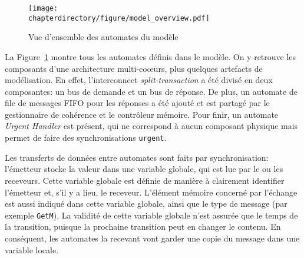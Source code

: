 \begin{figure}[hbt!]
\begin{center}
\texttt{[image: \\chapterdirectory/figure/model\_overview.pdf]}
\end{center}
\caption{Vue d'ensemble des automates du modèle}
\label{fr:fig:UPPAAL:automata_overview}
\end{figure}

La Figure~\ref{fr:fig:UPPAAL:automata_overview} montre tous les automates
définis dans le modèle. On y retrouve les composants d'une architecture multi-coœurs, plus quelques artefacts de modélisation. En effet,
l'interconnect \textit \textit{split-transaction} a été divisé en deux
composantes: un bus de demande et un bus de réponse. De plus, un automate de
file de messages FIFO pour les réponses a été ajouté et est partagé par le
gestionnaire de cohérence et le contrôleur mémoire. Pour finir, un automate
\textit{Urgent Handler} est présent, qui ne correspond à aucun composant
physique mais permet de faire des synchronisations \texttt{urgent}.


Les transferts de données entre automates sont faits par synchronisation:
l'émetteur stocke la valeur dans une variable globale, qui est lue par le ou
les receveurs. Cette variable globale est définie de manière à clairement
identifier l'émetteur et, s'il y a lieu, le receveur. L'élément mémoire concerné
par l'échange est aussi indiqué dans cette variable globale, ainsi que le type
de message (par exemple \texttt{GetM}). La validité de cette variable globale
n'est assurée que le temps de la transition, puisque la prochaine transition
peut en changer le contenu. En conséquent, les automates la recevant vont
garder une copie du message dans une variable locale.

% 

